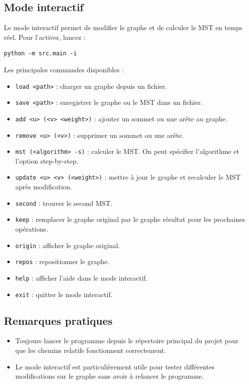 \subsection{Mode interactif}

Le mode interactif permet de modifier le graphe et de calculer le MST en temps réel.
Pour l'activer, lancez :

\begin{verbatim}
python -m src.main -i
\end{verbatim}

Les principales commandes disponibles :

\begin{itemize}
    \item \texttt{load <path>} : charger un graphe depuis un fichier.
    \item \texttt{save <path>} : enregistrer le graphe ou le MST dans un fichier.
    \item \texttt{add <u> (<v> <weight>)} : ajouter un sommet ou une arête au graphe.
    \item \texttt{remove <u> (<v>)} : supprimer un sommet ou une arête.
    \item \texttt{mst (<algorithm> -s)} : calculer le MST. On peut spécifier l'algorithme et l'option step-by-step.
    \item \texttt{update <u> <v> (<weight>)} : mettre à jour le graphe et recalculer le MST après modification.
    \item \texttt{second} : trouver le second MST.
    \item \texttt{keep} : remplacer le graphe original par le graphe résultat pour les prochaines opérations.
    \item \texttt{origin} : afficher le graphe original.
    \item \texttt{repos} : repositionner le graphe.
    \item \texttt{help} : afficher l'aide dans le mode interactif.
    \item \texttt{exit} : quitter le mode interactif.
\end{itemize}

\subsection{Remarques pratiques}

\begin{itemize}
    \item Toujours lancer le programme depuis le répertoire principal du projet pour que les chemins relatifs fonctionnent correctement.
    \item Le mode interactif est particulièrement utile pour tester différentes modifications sur le graphe sans avoir à relancer le programme.
\end{itemize}
